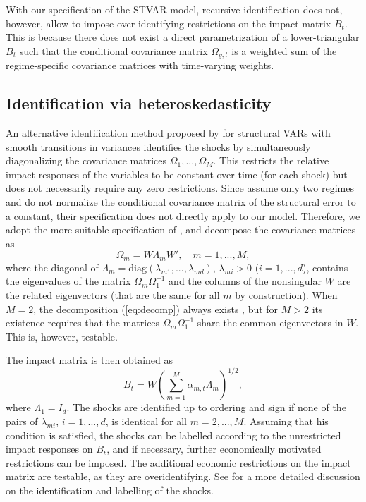 \documentclass[nojss]{jss}
\begin{document}
With our specification of the STVAR model, recursive identification does not, however, allow to impose over-identifying restrictions on the impact matrix $B_t$. This is because there does not exist a direct parametrization of a lower-triangular $B_t$ such that the conditional covariance matrix $\Omega_{y,t}$ is a weighted sum of the regime-specific covariance matrices with time-varying weights.

\subsection{Identification via heteroskedasticity}
An alternative identification method proposed by \cite{Lutkepohl+Netsunajev:2017} for structural VARs with smooth transitions in variances \citep[see also the seminal paper by][]{Rigobon:2003} identifies the shocks by simultaneously diagonalizing the covariance matrices $\Omega_1,...,\Omega_M$. This restricts the relative impact responses of the variables to be constant over time (for each shock) but does not necessarily require any zero restrictions. Since \cite{Lutkepohl+Netsunajev:2017} assume only two regimes and do not normalize the conditional covariance matrix of the structural error to a constant, their specification does not directly apply to our model. Therefore, we adopt the more suitable specification of \cite{Virolainen:2024}, and decompose the covariance matrices as
\begin{equation}\label{eq:decomp}
\Omega_m=W\Lambda_mW', \quad m=1,...,M,
\end{equation}
where the diagonal of $\Lambda_m=\text{diag}(\lambda_{m1},...,\lambda_{md})$, $\lambda_{mi}>0$ ($i=1,...,d$), contains the eigenvalues of the matrix $\Omega_m\Omega_1^{-1}$ and the columns of the nonsingular $W$ are the related eigenvectors (that are the same for all $m$ by construction). When $M=2$, the decomposition (\ref{eq:decomp}) always exists \citep[Theorem A9.9]{Muirhead:1982}, but for $M>2$ its existence requires that the matrices $\Omega_m\Omega_1^{-1}$ share the common eigenvectors in $W$. This is, however, testable.

The impact matrix is then obtained as
\begin{equation}
B_t=W\left(\sum_{m=1}^M\alpha_{m,t}\Lambda_m\right)^{1/2},
\end{equation}
where $\Lambda_1=I_d$. The shocks are identified up to ordering and sign if none of the pairs of $\lambda_{mi}$, $i=1,...,d$, is identical for all $m=2,...,M$. Assuming that his condition is satisfied, the shocks can be labelled according to the unrestricted impact responses on $B_t$, and if necessary, further economically motivated restrictions can be imposed. The additional economic restrictions on the impact matrix are testable, as they are overidentifying. See \cite{Virolainen:2024} for a more detailed discussion on the identification and labelling of the shocks.
\end{document}
